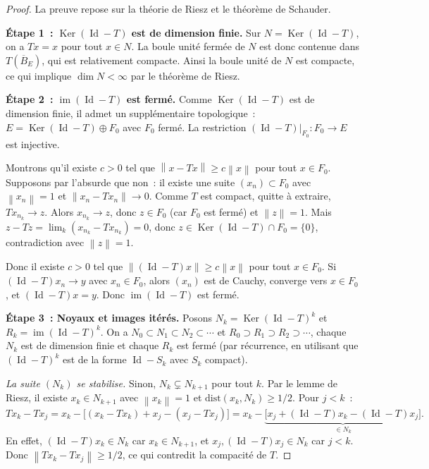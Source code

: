 \documentclass[a4paper,12pt]{book}
\DeclareMathOperator{\im}{im}
\DeclareMathOperator{\Id}{Id}
\DeclareMathOperator{\Ker}{Ker}
\newcommand{\norm}[1]{\left\| #1 \right\|}
\theoremstyle{definition}
\theoremstyle{plain}
\theoremstyle{remark}
\begin{document}
\begin{proof}
La preuve repose sur la théorie de Riesz et le théorème de Schauder.

\textbf{Étape 1~: $\Ker(\Id - T)$ est de dimension finie.}
Sur $N = \Ker(\Id - T)$, on a $Tx = x$ pour tout $x \in N$. La boule unité fermée de $N$
est donc contenue dans $T(\overline{B}_E)$, qui est relativement compacte. Ainsi la boule
unité de $N$ est compacte, ce qui implique $\dim N < \infty$ par le théorème de Riesz.

\textbf{Étape 2~: $\im(\Id - T)$ est fermé.}
Comme $\Ker(\Id - T)$ est de dimension finie, il admet un supplémentaire topologique~:
$E = \Ker(\Id - T) \oplus F_0$ avec $F_0$ fermé. La restriction
$(\Id - T)|_{F_0} : F_0 \to E$ est injective.

Montrons qu'il existe $c > 0$ tel que $\norm{x - Tx} \ge c \norm{x}$ pour tout
$x \in F_0$. Supposons par l'absurde que non~: il existe une suite $(x_n) \subset F_0$
avec $\norm{x_n} = 1$ et $\norm{x_n - Tx_n} \to 0$. Comme $T$ est compact, quitte à
extraire, $Tx_{n_k} \to z$. Alors $x_{n_k} \to z$, donc $z \in F_0$ (car $F_0$ est
fermé) et $\norm{z} = 1$. Mais $z - Tz = \lim_{k}(x_{n_k} - Tx_{n_k}) = 0$, donc
$z \in \Ker(\Id - T) \cap F_0 = \{0\}$, contradiction avec $\norm{z} = 1$.

Donc il existe $c > 0$ tel que $\norm{(\Id-T)x} \ge c\norm{x}$ pour tout $x \in F_0$.
Si $(\Id-T)x_n \to y$ avec $x_n \in F_0$, alors $(x_n)$ est de Cauchy, converge vers
$x \in F_0$, et $(\Id-T)x = y$. Donc $\im(\Id-T)$ est fermé.

\textbf{Étape 3~: Noyaux et images itérés.}
Posons $N_k = \Ker(\Id - T)^k$ et $R_k = \im(\Id - T)^k$. On a
$N_0 \subset N_1 \subset N_2 \subset \cdots$ et
$R_0 \supset R_1 \supset R_2 \supset \cdots$, chaque $N_k$ est de dimension finie et
chaque $R_k$ est fermé (par récurrence, en utilisant que $(\Id-T)^k$ est de la forme
$\Id - S_k$ avec $S_k$ compact).

\emph{La suite $(N_k)$ se stabilise.} Sinon, $N_k \subsetneq N_{k+1}$ pour tout $k$.
Par le lemme de Riesz, il existe $x_k \in N_{k+1}$ avec $\norm{x_k} = 1$ et
$\mathrm{dist}(x_k, N_k) \ge 1/2$. Pour $j < k$~:
\[
  Tx_k - Tx_j = x_k - \bigl[(x_k - Tx_k) + x_j - (x_j - Tx_j)\bigr]
              = x_k - \underbrace{\bigl[x_j + (\Id-T)x_k - (\Id-T)x_j\bigr]}_{\in N_k}.
\]
En effet, $(\Id-T)x_k \in N_k$ car $x_k \in N_{k+1}$, et $x_j, (\Id-T)x_j \in N_k$
car $j < k$. Donc $\norm{Tx_k - Tx_j} \ge 1/2$, ce qui contredit la compacité de $T$.


\end{proof}
\end{document}
